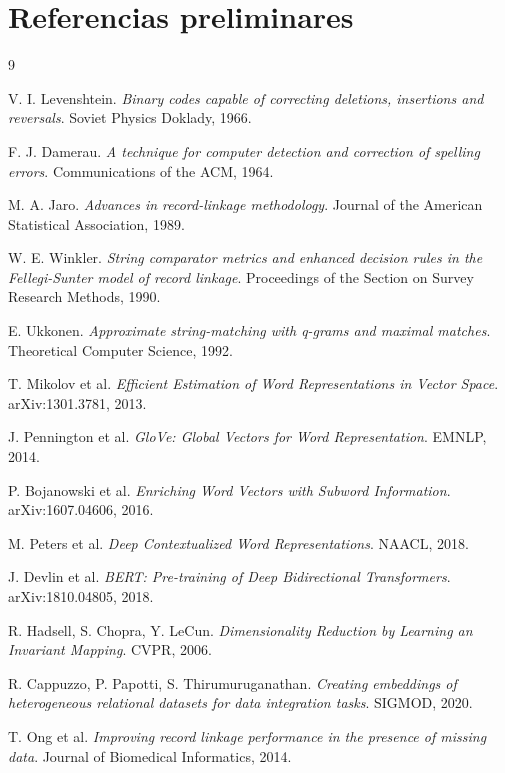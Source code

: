\section{Referencias preliminares}

\begin{thebibliography}{9}

V. I. Levenshtein.
\textit{Binary codes capable of correcting deletions, insertions and reversals}.
Soviet Physics Doklady, 1966.

F. J. Damerau.
\textit{A technique for computer detection and correction of spelling errors}.
Communications of the ACM, 1964.

M. A. Jaro.
\textit{Advances in record-linkage methodology}.
Journal of the American Statistical Association, 1989.

W. E. Winkler.
\textit{String comparator metrics and enhanced decision rules in the Fellegi-Sunter model of record linkage}.
Proceedings of the Section on Survey Research Methods, 1990.

E. Ukkonen.
\textit{Approximate string-matching with q-grams and maximal matches}.
Theoretical Computer Science, 1992.

T. Mikolov et al.
\textit{Efficient Estimation of Word Representations in Vector Space}.
arXiv:1301.3781, 2013.

J. Pennington et al.
\textit{GloVe: Global Vectors for Word Representation}.
EMNLP, 2014.

P. Bojanowski et al.
\textit{Enriching Word Vectors with Subword Information}.
arXiv:1607.04606, 2016.

M. Peters et al.
\textit{Deep Contextualized Word Representations}.
NAACL, 2018.

J. Devlin et al.
\textit{BERT: Pre-training of Deep Bidirectional Transformers}.
arXiv:1810.04805, 2018.

R. Hadsell, S. Chopra, Y. LeCun.
\textit{Dimensionality Reduction by Learning an Invariant Mapping}.
CVPR, 2006.

R. Cappuzzo, P. Papotti, S. Thirumuruganathan.
\textit{Creating embeddings of heterogeneous relational datasets for data integration tasks}.
SIGMOD, 2020.

T. Ong et al.
\textit{Improving record linkage performance in the presence of missing data}.
Journal of Biomedical Informatics, 2014.

\end{thebibliography}
